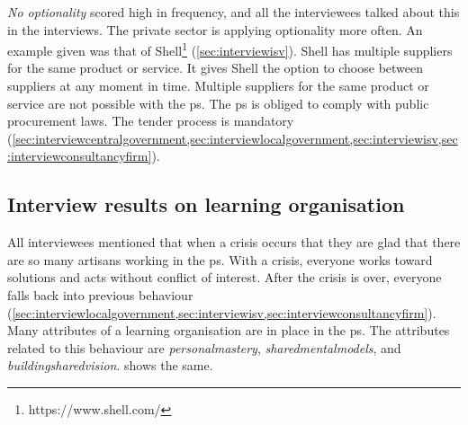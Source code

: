 \textit{No \gls{optionality}} scored high in frequency, and all the interviewees talked about this in the interviews. The private sector is applying optionality more often. An example given was that of Shell\footnote{https://www.shell.com/} (\cref{sec:interviewisv}). Shell has multiple suppliers for the same product or service. It gives Shell the option to choose between suppliers at any moment in time. Multiple suppliers for the same product or service are not possible with the \gls{ps}. The \gls{ps} is obliged to comply with public procurement laws. The tender process is mandatory (\cref{sec:interviewcentralgovernment,sec:interviewlocalgovernment,sec:interviewisv,sec:interviewconsultancyfirm}).
\subsection{Interview results on learning organisation}
\label{sub:interviewresultslearning}
All interviewees mentioned that when a crisis occurs that they are glad that there are so many artisans working in the \gls{ps}. With a crisis, everyone works toward solutions and acts without conflict of interest. After the crisis is over, everyone falls back into previous behaviour (\cref{sec:interviewlocalgovernment,sec:interviewisv,sec:interviewconsultancyfirm}). Many \glspl{attribute} of a learning organisation are in place in the \gls{ps}. The \glspl{attribute} related to this behaviour are \textit{\gls{personalmastery}}, \textit{\gls{sharedmentalmodels}}, and \textit{\gls{buildingsharedvision}}.  shows the same.

